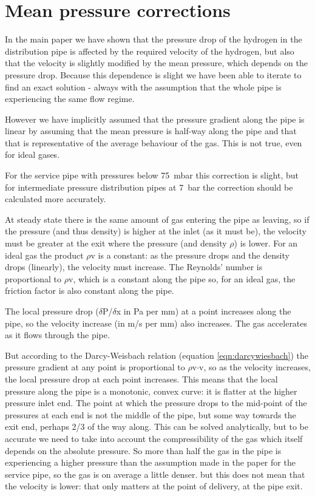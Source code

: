 \documentclass[5p]{elsarticle} %
\begin{document}
\section{Mean pressure corrections}
\label{sec:mean-pressure}
In the main paper we have shown that the pressure drop of the hydrogen in the distribution pipe is affected by the required velocity of the hydrogen, but also that the velocity is slightly modified by the mean pressure, which depends on the pressure drop. Because this dependence is slight we have been able to iterate to find an exact solution - always with the assumption that the whole pipe is experiencing the same flow regime.

However we have implicitly assumed that the pressure gradient along the pipe is linear by assuming that the mean pressure is half-way along the pipe and that that is representative of the average behaviour of the gas. This is not true, even for ideal gases.

For the service pipe with pressures below 75~mbar this correction is slight, but for intermediate pressure distribution pipes at 7~bar the correction should be calculated more accurately.

At steady state there is the same amount of gas entering the pipe as leaving, so if the pressure (and thus density) is higher at the inlet (as it must be), the velocity must be greater at the exit where the pressure (and density $\rho$) is lower. For an ideal gas the product $\rho$v is a constant: as the pressure drops and the density drops (linearly), the velocity must increase.  The Reynolds' number is proportional to $\rho$v, which is a constant along the pipe so, for an ideal gas,  the friction factor is also constant along the pipe.

The local pressure drop ($\delta$P/$\delta$x in Pa per mm) at a point increases along the pipe, so the velocity increase (in m/s per mm) also increases. The gas accelerates as it flows through the pipe.

But according to the Darcy-Weisbach relation (equation \ref{eqn:darcywiesbach}) the pressure gradient at any point is proportional to  $\rho$v$\cdot$v, so as the velocity increases, the local pressure drop at each point increases. This means that the local pressure along the pipe is a monotonic, convex curve: it is flatter at the higher pressure inlet end. The point at which the pressure drops to the mid-point of the pressures at each end is not the middle of the pipe, but some way towards the exit end, perhaps 2/3 of the way along. This can be solved analytically, but to be accurate we need to take into account the compressibility of the gas which itself depends on the absolute pressure. So more than half the gas in the pipe is experiencing a higher pressure than the assumption made in the paper for the service pipe, so the gas is on average a little denser. but this does not mean that the velocity is lower: that only matters at the point of delivery, at the pipe exit.
\end{document}
